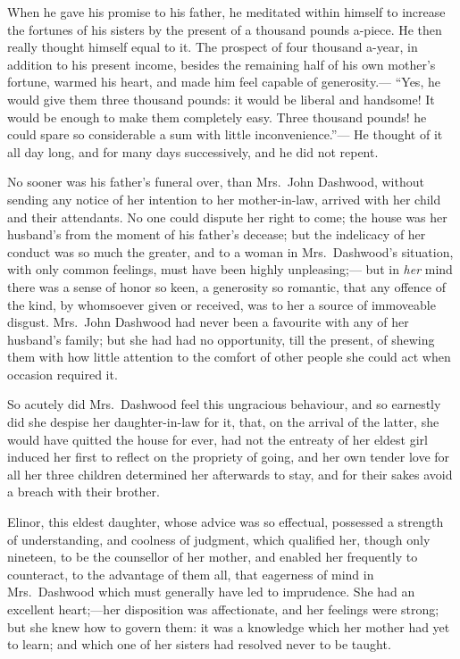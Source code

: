 When he gave his promise to his father, he meditated
within himself to increase the fortunes of his sisters
by the present of a thousand pounds a-piece.  He then
really thought himself equal to it.  The prospect of four
thousand a-year, in addition to his present income,
besides the remaining half of his own mother's fortune,
warmed his heart, and made him feel capable of generosity.---%
``Yes, he would give them three thousand pounds: it would
be liberal and handsome! It would be enough to make
them completely easy.  Three thousand pounds! he could
spare so considerable a sum with little inconvenience.''---%
He thought of it all day long, and for many days successively,
and he did not repent.

No sooner was his father's funeral over, than Mrs.\ John
Dashwood, without sending any notice of her intention to her
mother-in-law, arrived with her child and their attendants.
No one could dispute her right to come; the house was
her husband's from the moment of his father's decease;
but the indelicacy of her conduct was so much the greater,
and to a woman in Mrs.\ Dashwood's situation, with only
common feelings, must have been highly unpleasing;---%
but in \emph{her} mind there was a sense of honor so keen,
a generosity so romantic, that any offence of the kind,
by whomsoever given or received, was to her a source
of immoveable disgust.  Mrs.\ John Dashwood had never
been a favourite with any of her husband's family;
but she had had no opportunity, till the present,
of shewing them with how little attention to the comfort
of other people she could act when occasion required it.

So acutely did Mrs.\ Dashwood feel this ungracious
behaviour, and so earnestly did she despise her
daughter-in-law for it, that, on the arrival of the latter,
she would have quitted the house for ever, had not the
entreaty of her eldest girl induced her first to reflect
on the propriety of going, and her own tender love for all
her three children determined her afterwards to stay,
and for their sakes avoid a breach with their brother.

Elinor, this eldest daughter, whose advice was
so effectual, possessed a strength of understanding,
and coolness of judgment, which qualified her,
though only nineteen, to be the counsellor of her mother,
and enabled her frequently to counteract, to the advantage
of them all, that eagerness of mind in Mrs.\ Dashwood
which must generally have led to imprudence.  She had
an excellent heart;---her disposition was affectionate,
and her feelings were strong; but she knew how to govern
them: it was a knowledge which her mother had yet to learn;
and which one of her sisters had resolved never to be taught.

